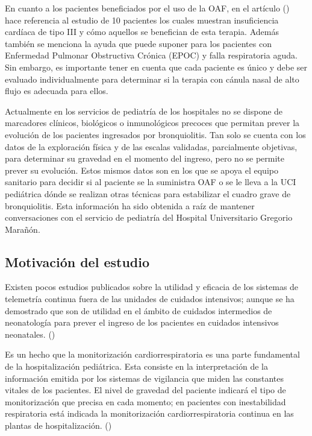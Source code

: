 En cuanto a los pacientes beneficiados por el uso de la OAF, en el artículo (\cite{Lodeserto2018}) hace referencia al estudio de 10 pacientes los cuales muestran insuficiencia cardíaca de tipo III y cómo aquellos se benefician de esta terapia. Además también se menciona la ayuda que puede suponer para los pacientes con Enfermedad Pulmonar Obstructiva Crónica (EPOC) y falla respiratoria aguda. Sin embargo, es importante tener en cuenta que cada paciente es único y debe ser evaluado individualmente para determinar si la terapia con cánula nasal de alto flujo es adecuada para ellos.

Actualmente en los servicios de pediatría de los hospitales no se dispone de marcadores clínicos, biológicos o inmunológicos precoces que permitan prever la evolución de los pacientes ingresados por bronquiolitis. Tan solo se cuenta con los datos de la exploración física y de las escalas validadas, parcialmente objetivas, para determinar su gravedad en el momento del ingreso, pero no se permite prever su evolución. Estos mismos datos son en los que se apoya el equipo sanitario para decidir si al paciente se la suministra OAF o se le lleva a la UCI pediátrica dónde se realizan otras técnicas para estabilizar el cuadro grave de bronquiolitis. Esta información ha sido obtenida a raíz de mantener conversaciones con el servicio de pediatría del Hospital Universitario Gregorio Marañón.


\subsection{Motivación del estudio}

Existen pocos estudios publicados sobre la utilidad y eficacia de los sistemas de telemetría continua fuera de las unidades de cuidados intensivos; aunque se ha demostrado que son de utilidad en el ámbito de cuidados intermedios de neonatología para prever el ingreso de los pacientes en cuidados intensivos neonatales. (\cite{Solis2022})

Es un hecho que la monitorización cardiorrespiratoria es una parte fundamental de la hospitalización pediátrica. Esta consiste en la interpretación de la información emitida por los sistemas de vigilancia que miden las constantes vitales de los pacientes. El nivel de gravedad del paciente indicará el tipo de monitorización que precisa en cada momento; en pacientes con inestabilidad respiratoria está indicada la monitorización cardiorrespiratoria continua en las plantas de hospitalización. (\cite{AmandaC})

